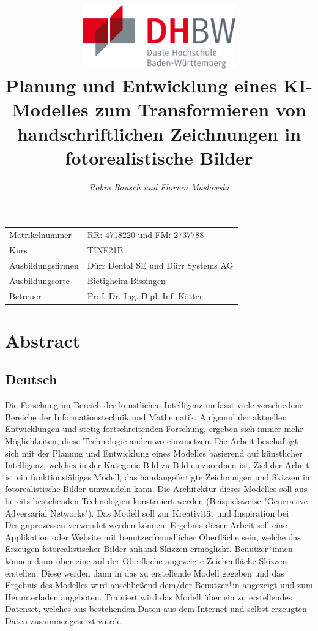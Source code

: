 \documentclass[12pt,a4paper]{article}
\author{\slshape Robin Rausch und Florian Maslowski}
\title{\includegraphics[height=2.75cm]{Bilder/dhbw_logo.png}\vspace{2cm}\\\textbf{Planung und Entwicklung eines KI-Modelles zum Transformieren von handschriftlichen Zeichnungen in fotorealistische Bilder}}
\begin{document}
\pagestyle{titlepage}
\clearpage\maketitle
\thispagestyle{empty}
\vspace*{\fill}
\begin{center}
	\begin{tabularx}{\textwidth}{X X}
		Matrikelnummer & RR: 4718220 und FM: 2737788 \\
		Kurs & TINF21B \\
		Ausbildungsfirmen & Dürr Dental SE und Dürr Systems AG \\
		Ausbildungsorte & Bietigheim-Bissingen \\
		Betreuer & Prof. Dr.-Ing. Dipl. Inf. Kötter \\
	\end{tabularx}
\end{center}

\newpage
{}

\pagestyle{fancy_transition}
\section*{Abstract}
\subsection*{Deutsch}
	Die Forschung im Bereich der künstlichen Intelligenz umfasst viele verschiedene Bereiche der Informationstechnik und Mathematik. 
	Aufgrund der aktuellen Entwicklungen und stetig fortschreitenden Forschung, ergeben sich immer mehr Möglichkeiten, diese Technologie anderswo einzusetzen.
	Die Arbeit beschäftigt sich mit der Planung und Entwicklung eines Modelles basierend auf künstlicher Intelligenz, welches in der Kategorie Bild-zu-Bild einzuordnen ist. 
	Ziel der Arbeit ist ein funktionsfähiges Modell, das handangefertigte Zeichnungen und Skizzen in fotorealistische Bilder umwandeln kann. 
	Die Architektur dieses Modelles soll aus bereits bestehenden Technologien konstruiert werden (Beispielsweise "Generative Adversarial Networks"). 
	Das Modell soll zur Kreativität und Inspiration bei Designprozessen verwendet werden können. 
	Ergebnis dieser Arbeit soll eine Applikation oder Website mit benutzerfreundlicher Oberfläche sein, welche das Erzeugen fotorealistischer Bilder anhand Skizzen ermöglicht. 
	Benutzer*innen können dann über eine auf der Oberfläche angezeigte Zeichenfläche Skizzen erstellen. 
	Diese werden dann in das zu erstellende Modell gegeben und das Ergebnis des Modelles wird anschließend dem/der Benutzer*in angezeigt und zum Herunterladen angeboten. 
	Trainiert wird das Modell über ein zu erstellendes Datenset, welches aus bestehenden Daten aus dem Internet und selbst erzeugten Daten zusammengesetzt wurde. 
\end{document}
